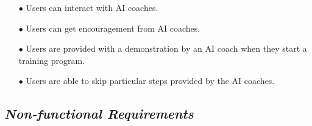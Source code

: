 \documentclass[a4paper]{article}
\begin{document}
\begin{itemize}
\begin{itemize}
\begin{itemize}
				\item[$\bullet$] Users can interact with AI coaches.
				\item[$\bullet$] Users can get encouragement from AI coaches.	
				\item[$\bullet$] Users are provided with a demonstration by an AI coach when they start a training program.
				\item[$\bullet$] Users are able to skip particular steps provided by the AI coaches.							
			\end{itemize}
		\end{itemize}
	\end{itemize}
	
	\subsection{\textsl{Non-functional Requirements}}
\end{document}
